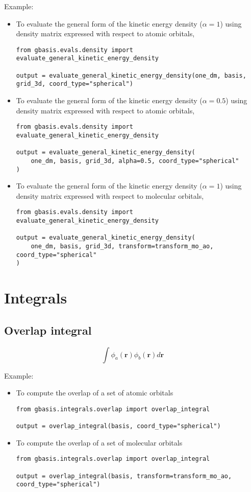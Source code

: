 \documentclass[letterpaper]{article}
\begin{document}
Example:
\begin{itemize}
\item To evaluate the general form of the kinetic energy density ($\alpha=1$)
  using density matrix expressed with respect to atomic orbitals,
  \begin{lstlisting}[xleftmargin=-25pt]
from gbasis.evals.density import evaluate_general_kinetic_energy_density

output = evaluate_general_kinetic_energy_density(one_dm, basis, grid_3d, coord_type="spherical")
\end{lstlisting}
\item To evaluate the general form of the kinetic energy density ($\alpha=0.5$)
  using density matrix expressed with respect to atomic orbitals,
  \begin{lstlisting}[xleftmargin=-25pt]
from gbasis.evals.density import evaluate_general_kinetic_energy_density

output = evaluate_general_kinetic_energy_density(
    one_dm, basis, grid_3d, alpha=0.5, coord_type="spherical"
)
\end{lstlisting}
\item To evaluate the general form of the kinetic energy density ($\alpha=1$)
  using density matrix expressed with respect to molecular orbitals,
  \begin{lstlisting}[xleftmargin=-25pt]
from gbasis.evals.density import evaluate_general_kinetic_energy_density

output = evaluate_general_kinetic_energy_density(
    one_dm, basis, grid_3d, transform=transform_mo_ao, coord_type="spherical"
)
\end{lstlisting}
\end{itemize}
\section{Integrals}

\subsection{Overlap integral}
\begin{equation}
  \label{eq:overlap}
  \int \phi_a (\mathbf{r}) \phi_b (\mathbf{r}) d\mathbf{r}
\end{equation}

Example:
\begin{itemize}
\item To compute the overlap of a set of atomic orbitals
  \begin{lstlisting}[xleftmargin=-25pt]
from gbasis.integrals.overlap import overlap_integral

output = overlap_integral(basis, coord_type="spherical")
\end{lstlisting}
\item To compute the overlap of a set of molecular orbitals
  \begin{lstlisting}[xleftmargin=-25pt]
from gbasis.integrals.overlap import overlap_integral

output = overlap_integral(basis, transform=transform_mo_ao, coord_type="spherical")
\end{lstlisting}
\end{itemize}
\end{document}
